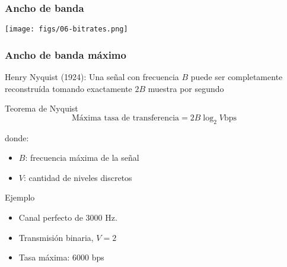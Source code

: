 \documentclass[letter]{beamer}
\begin{document}
\begin{frame}
  \frametitle{Ancho de banda}

  \begin{center}
    \texttt{[image: figs/06-bitrates.png]}
  \end{center}

\end{frame}
\begin{frame}
  \frametitle{Ancho de banda máximo}

  Henry Nyquist (1924): Una señal con frecuencia $B$ puede ser completamente reconstruída
  tomando exactamente $2B$ muestra por segundo
  
  \begin{alertblock}{Teorema de Nyquist}
    \[\text{Máxima tasa de transferencia} = 2B \log_2 V \text{bps}\]
  \end{alertblock}
  
  donde:
  \begin{itemize}
    \item $B$: frecuencia máxima de la señal
    \item $V$: cantidad de niveles discretos
  \end{itemize}
  Ejemplo
  \begin{itemize}
    \item Canal perfecto de $3000$ Hz.
    \item Transmisión binaria, $V=2$
    \item Tasa máxima: $6000$ bps
  \end{itemize}

\end{frame}
\end{document}
